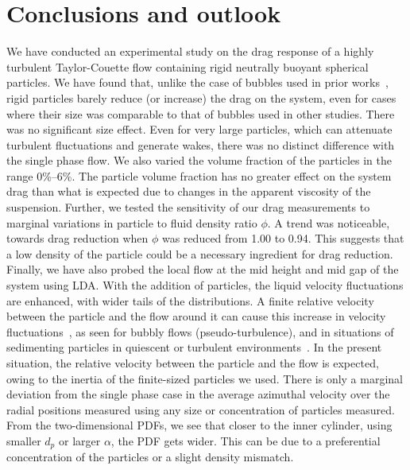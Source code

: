 \section{Conclusions and outlook}\label{sec:conclusions_and_outlook}
We have conducted an experimental study on the drag response of a highly
turbulent Taylor-Couette flow containing rigid neutrally buoyant spherical
particles. We have found that, unlike the case of bubbles used in prior
works~\citep{vanGils2013,Verschoof2016}, rigid particles barely reduce (or
increase) the drag on the system, even for cases where their size was
comparable to that of bubbles used in other studies.
There was no significant size effect. Even for very large particles, which can
attenuate turbulent fluctuations and generate wakes, there was no distinct
difference with the single phase flow.
We also varied the volume fraction of the particles in the range 0\%--6\%. The
particle volume fraction has no greater effect on the system drag than what is
expected due to changes in the apparent viscosity of the suspension. Further,
we tested the sensitivity of our drag measurements to marginal variations in
particle to fluid density ratio $\phi$. A trend was noticeable, towards drag
reduction when $\phi$ was reduced from 1.00 to 0.94. This suggests that a low
density of the particle could be a necessary ingredient for drag reduction.
Finally, we have also probed the local flow at the mid height and mid gap of
the system using LDA. With the addition of particles, the liquid velocity
fluctuations are enhanced, with wider tails of the distributions. A finite
relative velocity between the particle and the flow around it can cause this
increase in velocity fluctuations~\citep{Mathai2015}, as seen for bubbly flows
(pseudo-turbulence), and in situations of sedimenting particles in quiescent
or turbulent environments~\citep{Gore1989}.  In the present situation, the
relative velocity between the particle and the flow is expected, owing to the
inertia of the finite-sized particles we used.
There is only a marginal deviation from the single phase case in the average
azimuthal velocity over the radial positions measured using any size or
concentration of particles measured. From the two-dimensional PDFs, we see
that closer to the inner cylinder, using smaller $d_p$ or larger $\alpha$, the
PDF gets wider. This can be due to a preferential concentration of the
particles or a slight density mismatch.


